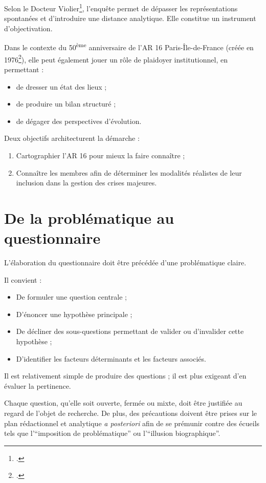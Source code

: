 \documentclass[12pt,a4paper]{article}
\begin{document}
Selon le Docteur Violier\footcite{violier_irsem}, l'enquête permet de dépasser
les représentations spontanées et d'introduire une distance analytique.
Elle constitue un instrument d'objectivation.

Dans le contexte du 50\textsuperscript{ème} anniversaire de l'AR 16 Paris-Île-de-France (créée en 1976\footcite{linkedin_AR16}), elle peut également jouer un rôle de plaidoyer institutionnel, en permettant :

\begin{itemize}
    \item de dresser un état des lieux ;
    \item de produire un bilan structuré ;
    \item de dégager des perspectives d'évolution.
\end{itemize}

Deux objectifs architecturent la démarche :

\begin{enumerate}
    \item Cartographier l'AR 16 pour mieux la faire connaître ;
    \item Connaître les membres afin de déterminer les modalités réalistes de leur inclusion dans la gestion des crises majeures.
\end{enumerate}

\newpage

\section{De la problématique au questionnaire}

L'élaboration du questionnaire doit être précédée d'une problématique claire.

Il convient :

\begin{itemize}
    \item De formuler une question centrale ;
    \item D'énoncer une hypothèse principale ;
    \item De décliner des sous-questions permettant de valider ou d'invalider cette hypothèse ;
    \item D'identifier les facteurs déterminants et les facteurs associés.
\end{itemize}

Il est relativement simple de produire des questions ; il est plus exigeant d'en évaluer la pertinence.

Chaque question, qu'elle soit ouverte, fermée ou mixte, doit être justifiée au regard de l'objet de recherche.
De plus, des précautions doivent être prises sur le plan rédactionnel et analytique \textit{a posteriori} afin de
se prémunir contre des écueils tels que l'\enquote{imposition de problématique}
ou l'\enquote{illusion biographique}.
\end{document}
